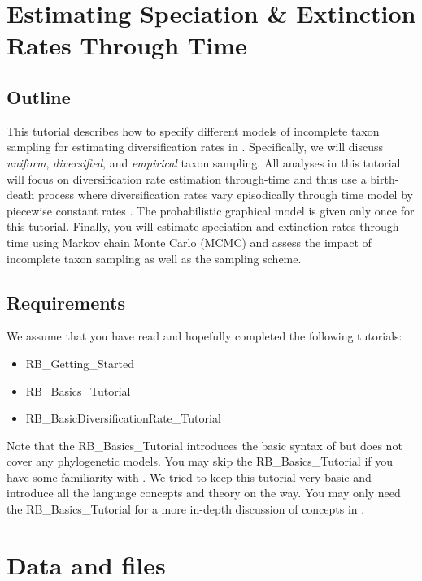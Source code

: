 \section{Estimating Speciation \& Extinction Rates Through Time}

\subsection{Outline}

This tutorial describes how to specify different models of incomplete taxon sampling for estimating diversification rates in \RevBayes \citep{Hoehna2011,Hoehna2014a,Hoehna2016b}.
Specifically, we will discuss \emph{uniform}, \emph{diversified}, and \emph{empirical} taxon sampling.
All analyses in this tutorial will focus on diversification rate estimation through-time and thus use a birth-death process where diversification rates vary episodically through time model by piecewise constant rates \RevBayes \citep{Hoehna2015a,May2016}.
The probabilistic graphical model is given only once for this tutorial.
Finally, you will estimate speciation and extinction rates through-time using Markov chain Monte Carlo (MCMC) and assess the impact of incomplete taxon sampling as well as the sampling scheme.


\subsection{Requirements}
We assume that you have read and hopefully completed the following tutorials:
\begin{itemize}
\item RB\_Getting\_Started
\item RB\_Basics\_Tutorial
\item RB\_BasicDiversificationRate\_Tutorial
\end{itemize}
Note that the RB\_Basics\_Tutorial introduces the basic syntax of \Rev but does not cover any phylogenetic models.
You may skip the RB\_Basics\_Tutorial if you have some familiarity with \R.
We tried to keep this tutorial very basic and introduce all the language concepts and theory on the way.
You may only need the RB\_Basics\_Tutorial for a more in-depth discussion of concepts in \Rev.


\section{Data and files}

